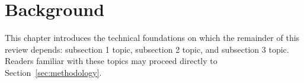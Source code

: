  \section{Background}
\label{sec:background}

This chapter introduces the technical foundations on which the remainder of
this review depends: subsection 1 topic, subsection 2 topic, and
subsection 3 topic. Readers familiar with these topics may proceed directly
to Section~\ref{sec:methodology}.
